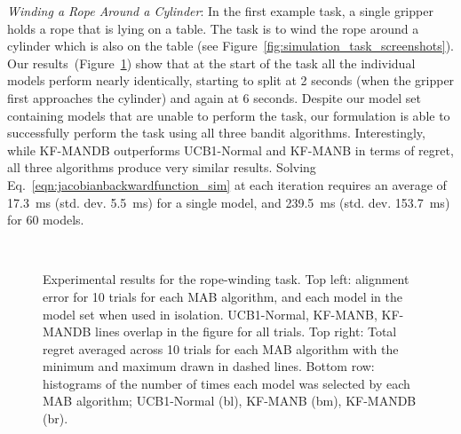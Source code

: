 \textit{Winding a Rope Around a Cylinder}: In the first example task, a single gripper holds a rope that is lying on a table. The task is to wind the rope around a cylinder which is also on the table (see Figure~\ref{fig:simulation_task_screenshots}). Our results~(Figure~\ref{fig:ropecylinder_results}) show that at the start of the task all the individual models perform nearly identically, starting to split at 2 seconds (when the gripper first approaches the cylinder) and again at 6 seconds. Despite our model set containing models that are unable to perform the task, our formulation is able to successfully perform the task using all three bandit algorithms. Interestingly, while KF-MANDB outperforms UCB1-Normal and KF-MANB in terms of regret, all three algorithms produce very similar results. Solving Eq.~\eqref{eqn:jacobianbackwardfunction_sim} at each iteration requires an average of 17.3~ms (std. dev. 5.5~ms) for a single model, and 239.5~ms (std. dev. 153.7~ms) for 60 models.

\begin{figure}[h]
    \centering
    \\
    \caption{Experimental results for the rope-winding task. Top left: alignment error for 10 trials for each MAB algorithm, and each model in the model set when used in isolation. UCB1-Normal, KF-MANB, KF-MANDB lines overlap in the figure for all trials. Top right: Total regret averaged across 10 trials for each MAB algorithm with the minimum and maximum drawn in dashed lines. Bottom row: histograms of the number of times each model was selected by each MAB algorithm; UCB1-Normal (bl), KF-MANB (bm), KF-MANDB (br).}
    \label{fig:ropecylinder_results}
\end{figure}


